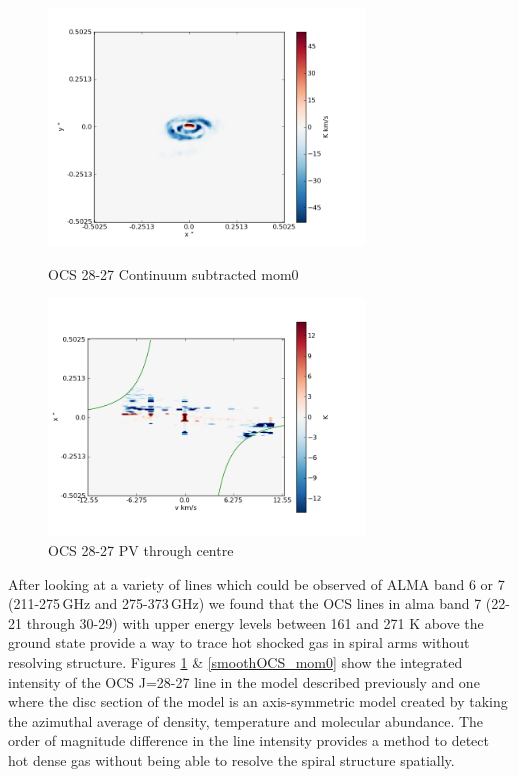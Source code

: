 \documentclass[useAMS,usenatbib]{mn2e}
\begin{document}
\begin{figure}
 \includegraphics[width=84mm]{Figures/sim/imageOCS_28-27_30deg_composite_contSub.png}
 \label{OCS_mom0}
 \caption{OCS 28-27 Continuum subtracted mom0}
\end{figure}

\begin{figure}
 \includegraphics[width=84mm]{Figures/sim/imageOCS_28-27_30deg_composite_PV_centre.png}

 \caption{OCS 28-27 PV through centre}
\end{figure}

After looking at a variety of lines which could be observed of ALMA band 6 or 7 (211-275$\,$GHz and 275-373$\,$GHz) we found that the OCS lines in alma band 7 (22-21 through 30-29) with upper energy levels between 161 and 271 K above the ground state provide a way to trace hot shocked gas in spiral arms without resolving structure. Figures \ref{OCS_mom0} \& \ref{smoothOCS_mom0} show the integrated intensity of the OCS J=28-27 line in the model described previously and one where the disc section of the model is an axis-symmetric model created by taking the azimuthal average of density, temperature and molecular abundance. The order of magnitude difference in the line intensity provides a method to detect hot dense gas without being able to resolve the spiral structure spatially.\newline
\end{document}
